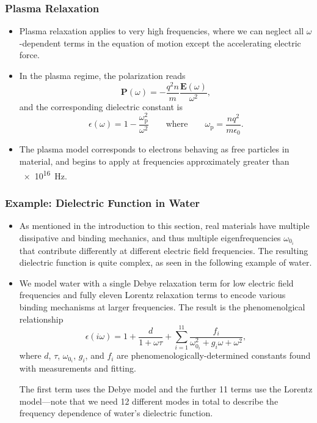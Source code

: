 \documentclass[11pt, a4paper]{article}
\renewcommand{\vec}[1]{\bm{#1}} %
\newcommand{\E}{\vec{E}} %
\renewcommand{\P}{\vec{P}}  %
\begin{document}
\subsubsection{Plasma Relaxation}
\begin{itemize}
    \item Plasma relaxation applies to very high frequencies, where we can neglect all $ \omega $-dependent terms in the equation of motion except the accelerating electric force.

    \item In the plasma regime, the polarization reads
    \begin{equation*}
        \P(\omega) = - \frac{q^{2}n}{m} \frac{\E(\omega)}{\omega^{2}},
    \end{equation*}
    and the corresponding dielectric constant is
    \begin{equation*}
        \epsilon(\omega) = 1 - \frac{\omega_{\text{p}}^{2}}{\omega^{2}} \qquad \text{where} \qquad \omega_{\text{p}} = \frac{nq^{2}}{m\epsilon_{0}}. 
    \end{equation*}
    
    \item The plasma model corresponds to electrons behaving as free particles in material, and begins to apply at frequencies approximately greater than \SI{e16}{\hertz}.
\end{itemize}
    
\subsubsection{Example: Dielectric Function in Water}
\begin{itemize}
    \item As mentioned in the introduction to this section, real materials have multiple dissipative and binding mechanics, and thus multiple eigenfrequencies $ \omega_{0_{i}} $ that contribute differently at different electric field frequencies. The resulting dielectric function is quite complex, as seen in the following example of water. 

    \item We model water with a single Debye relaxation term for low electric field frequencies and fully eleven Lorentz relaxation terms to encode various binding mechanisms at larger frequencies. The result is the phenomenolgical relationship
    \begin{equation*}
        \epsilon(i\omega) = 1 + \frac{d}{1 + \omega\tau} + \sum_{i = 1}^{11} \frac{f_{i}}{\omega_{0_{i}}^{2} + g_{i}\omega + \omega^{2}},
    \end{equation*}
    where $ d $, $ \tau $, $ \omega_{0_{i}} $, $ g_{i} $, and $ f_{i} $ are phenomenologically-determined constants found with measurements and fitting.

    The first term uses the Debye model and the further 11 terms use the Lorentz model---note that we need 12 different modes in total to describe the frequency dependence of water's dielectric function.
    
\end{itemize}
\end{document}
